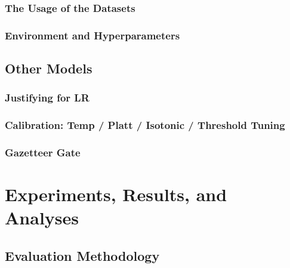 \documentclass[12pt]{article}
\begin{document}
\subsubsection{The Usage of the Datasets}

\subsubsection{Environment and Hyperparameters}

\subsection{Other Models}
\subsubsection{Justifying for LR}
\subsubsection{Calibration: Temp / Platt / Isotonic / Threshold Tuning}
\subsubsection{Gazetteer Gate}

\section{Experiments, Results, and Analyses}

\subsection{Evaluation Methodology}
\end{document}
